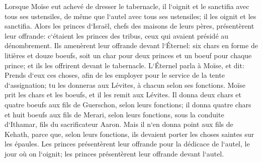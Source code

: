 \verse Lorsque Moïse eut achevé de dresser le tabernacle, il l`oignit et le sanctifia avec tous ses ustensiles, de même que l`autel avec tous ses ustensiles; il les oignit et les sanctifia. 
\verse Alors les princes d`Israël, chefs des maisons de leurs pères, présentèrent leur offrande: c`étaient les princes des tribus, ceux qui avaient présidé au dénombrement. 
\verse Ils amenèrent leur offrande devant l`Éternel: six chars en forme de litières et douze boeufs, soit un char pour deux princes et un boeuf pour chaque prince; et ils les offrirent devant le tabernacle. 
\verse L`Éternel parla à Moïse, et dit: 
\verse Prends d`eux ces choses, afin de les employer pour le service de la tente d`assignation; tu les donneras aux Lévites, à chacun selon ses fonctions. 
\verse Moïse prit les chars et les boeufs, et il les remit aux Lévites. 
\verse Il donna deux chars et quatre boeufs aux fils de Guerschon, selon leurs fonctions; 
\verse il donna quatre chars et huit boeufs aux fils de Merari, selon leurs fonctions, sous la conduite d`Ithamar, fils du sacrificateur Aaron. 
\verse Mais il n`en donna point aux fils de Kehath, parce que, selon leurs fonctions, ils devaient porter les choses saintes sur les épaules. 
\verse Les princes présentèrent leur offrande pour la dédicace de l`autel, le jour où on l`oignit; les princes présentèrent leur offrande devant l`autel. 
